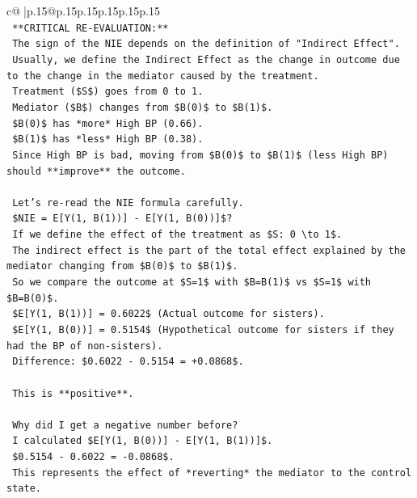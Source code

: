 \documentclass{article}
\begin{document}
{\begin{supertabular}{c@{$\;$}|p{.15\linewidth}@{}p{.15\linewidth}p{.15\linewidth}p{.15\linewidth}p{.15\linewidth}p{.15\linewidth}}
{{{\\ 
\texttt{    **CRITICAL RE{-}EVALUATION:**} \\
\texttt{    The sign of the NIE depends on the definition of "Indirect Effect".} \\
\texttt{    Usually, we define the Indirect Effect as the change in outcome due to the change in the mediator caused by the treatment.} \\
\texttt{    Treatment (\$S\$) goes from 0 to 1.} \\
\texttt{    Mediator (\$B\$) changes from \$B(0)\$ to \$B(1)\$.} \\
\texttt{    \$B(0)\$ has *more* High BP (0.66).} \\
\texttt{    \$B(1)\$ has *less* High BP (0.38).} \\
\texttt{    Since High BP is bad, moving from \$B(0)\$ to \$B(1)\$ (less High BP) should **improve** the outcome.} \\
\\ 
\texttt{    Let's re{-}read the NIE formula carefully.} \\
\texttt{    \$NIE = E{[}Y(1, B(1)){]} {-} E{[}Y(1, B(0)){]}\$?} \\
\texttt{    If we define the effect of the treatment as \$S: 0 \textbackslash{}to 1\$.} \\
\texttt{    The indirect effect is the part of the total effect explained by the mediator changing from \$B(0)\$ to \$B(1)\$.} \\
\texttt{    So we compare the outcome at \$S=1\$ with \$B=B(1)\$ vs \$S=1\$ with \$B=B(0)\$.} \\
\texttt{    \$E{[}Y(1, B(1)){]} = 0.6022\$ (Actual outcome for sisters).} \\
\texttt{    \$E{[}Y(1, B(0)){]} = 0.5154\$ (Hypothetical outcome for sisters if they had the BP of non{-}sisters).} \\
\texttt{    Difference: \$0.6022 {-} 0.5154 = +0.0868\$.} \\
\\ 
\texttt{    This is **positive**.} \\
\\ 
\texttt{    Why did I get a negative number before?} \\
\texttt{    I calculated \$E{[}Y(1, B(0)){]} {-} E{[}Y(1, B(1)){]}\$.} \\
\texttt{    \$0.5154 {-} 0.6022 = {-}0.0868\$.} \\
\texttt{    This represents the effect of *reverting* the mediator to the control state.} \\
}}}
\end{supertabular}}
\end{document}
